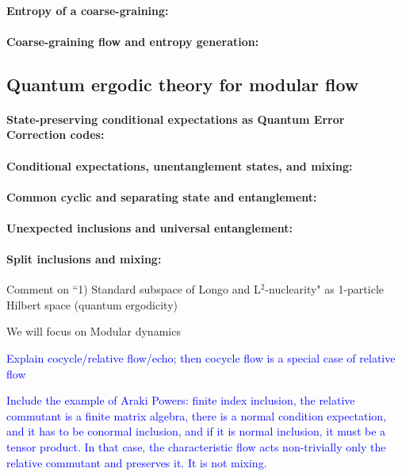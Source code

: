 \documentclass[a4paper,11pt]{article}
\theoremstyle{definition}
\newcommand{\NL}[1]{\textcolor{blue}{#1}}
\begin{document}
\paragraph{Entropy of a coarse-graining:}

\paragraph{Coarse-graining flow and entropy generation:}



\subsection{Quantum ergodic theory for modular flow}

\paragraph{State-preserving conditional expectations as Quantum Error Correction codes:}

\paragraph{Conditional expectations, unentanglement states, and mixing:}

\paragraph{Common cyclic and separating state and entanglement:}

\paragraph{Unexpected inclusions and universal entanglement:}


\paragraph{Split inclusions and mixing:}


Comment on ``1) Standard subspace of Longo and L$^2$-nuclearity" as 1-particle Hilbert space (quantum ergodicity)

We will focus on Modular dynamics

\NL{Explain cocycle/relative flow/echo; then cocycle flow is a special case of relative flow}

\NL{Include the example of Araki Powers: finite index inclusion, the relative commutant is a finite matrix algebra, there is a normal condition expectation, and it has to be conormal inclusion, and if it is normal inclusion, it must be a tensor product. In that case, the characteristic flow acts non-trivially only the relative commutant and preserves it. It is not mixing.}
\end{document}
